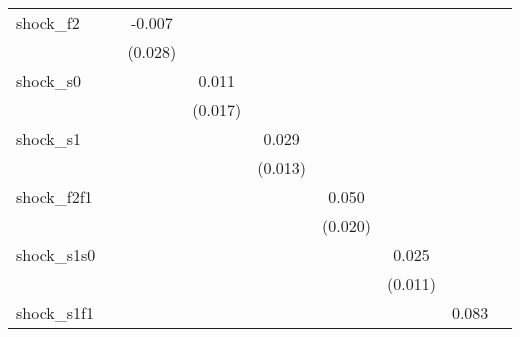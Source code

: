 {\begin{tabular}{l*{8}{c}}
\addlinespace
shock\_f2    &                     &      -0.007         &                     &                     &                     &                     &                     &                     \\
            &                     &     (0.028)         &                     &                     &                     &                     &                     &                     \\
\addlinespace
shock\_s0    &                     &                     &       0.011         &                     &                     &                     &                     &                     \\
            &                     &                     &     (0.017)         &                     &                     &                     &                     &                     \\
\addlinespace
shock\_s1    &                     &                     &                     &       0.029\sym{**} &                     &                     &                     &                     \\
            &                     &                     &                     &     (0.013)         &                     &                     &                     &                     \\
\addlinespace
shock\_f2f1  &                     &                     &                     &                     &       0.050\sym{**} &                     &                     &                     \\
            &                     &                     &                     &                     &     (0.020)         &                     &                     &                     \\
\addlinespace
shock\_s1s0  &                     &                     &                     &                     &                     &       0.025\sym{**} &                     &                     \\
            &                     &                     &                     &                     &                     &     (0.011)         &                     &                     \\
\addlinespace
shock\_s1f1  &                     &                     &                     &                     &                     &                     &       0.083\sym{**} &                     \\

\end{tabular}}
